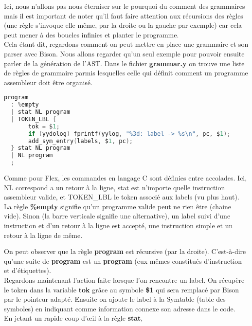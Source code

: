 \documentclass[14pt,a4paper]{article}
\begin{document}
	Ici, nous n'allons pas nous éterniser sur le pourquoi du comment des grammaires mais il est important de noter qu'il faut faire attention aux récursions des règles (une règle s'invoque elle même, par la droite ou la gauche par exemple) car cela peut mener à des boucles infinies et planter le programme.\\
	
	Cela étant dit, regardons comment on peut mettre en place une grammaire et son parser avec Bison. Nous allons regarder qu'un seul exemple pour pouvoir ensuite parler de la génération de l'AST. Dans le fichier \textbf{grammar.y} on trouve une liste de règles de grammaire parmis lesquelles celle qui définit comment un programme assembleur doit être organisé.\\
	
	\begin{lstlisting}[frame=simple,language=C]
program
  : %empty
  | stat NL program
  | TOKEN_LBL {
       tok = $1;
       if (yydolog) fprintf(yylog, "%3d: label -> %s\n", pc, $1);
       add_sym_entry(labels, $1, pc);
  } stat NL program
  | NL program
  ;
	\end{lstlisting}
	
	
	Comme pour Flex, les commandes en langage C sont définies entre accolades. Ici, NL correspond a un retour à la ligne, stat est n'importe quelle instruction assembleur valide, et TOKEN\_LBL le token associé aux labels (vu plus haut). \\
	
	La règle \textbf{\%empty} signifie qu'un programme valide peut ne rien être (chaine vide). Sinon (la barre verticale signifie une alternative), un label suivi d'une instruction et d'un retour à la ligne est accepté, une instruction simple et un retour à la ligne de même.
	
	On peut observer que la règle \textbf{program} est récursive (par la droite). C'est-à-dire qu'une suite de \textbf{program} est un \textbf{program} (eux mêmes constitués d'instruction et d'étiquettes). \\
	
	Regardons maintenant l'action faite lorsque l'on rencontre un label. On récupère le token dans la variable \textbf{tok} grâce au symbole \textbf{\$1} qui sera remplacé par Bison par le pointeur adapté. Ensuite on ajoute le label à la Symtable (table des symboles) en indiquant comme information connexe son adresse dans le code. \\
	
	En jetant un rapide coup d'œil à la règle \textbf{stat},
	
\end{document}
